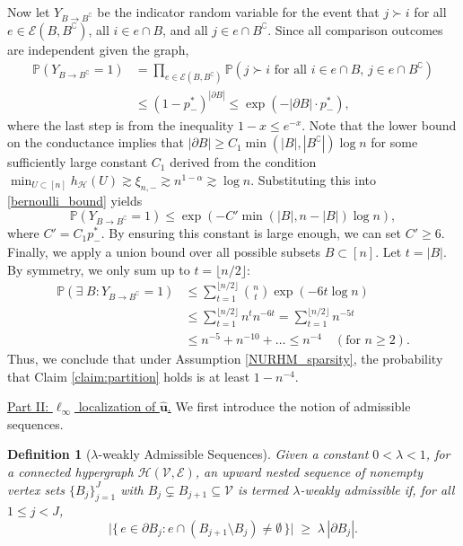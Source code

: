 \documentclass[
  12pt]{article}
\newtheorem{definition}{Definition}
\begin{document}
Now let $Y_{B \to B^\complement}$ be the indicator random variable for the event that  $j \succ i$ for all
$e \in \mathcal{E}(B, B^\complement)$, all $i \in e \cap B$, and all
$j \in e \cap B^\complement$. Since all comparison outcomes are independent given the graph,
\begin{align}
        \mathbb{P}\left(Y_{B \to B^\complement} = 1\right)& = \prod_{e \in \mathcal{E}(B, B^\complement)} \mathbb{P}\left(j \succ i \text{ for all }
            i \in e \cap B,\, j \in e \cap B^\complement\right) \nonumber\\
        &  \leq (1 - p^*_{-})^{|\partial B|} \leq \exp\left( - |\partial B| \cdot p^*_{-} \right),\label{bernoulli_bound}
\end{align}
where the last step is from the inequality $1-x \leq e^{-x}$. Note that the lower bound on the conductance implies that $|\partial B| \geq C_1 \min(|B|, |B^\complement|) \log n$ for some sufficiently large constant $C_1$ derived from the condition $\min_{U \subset[n]} h_{\mathcal{H}}(U) \gtrsim \xi_{n,-} \gtrsim n^{1-\alpha}\gtrsim \log n$. Substituting this into \eqref{bernoulli_bound} yields
$$
\mathbb{P}\left(Y_{B \to B^\complement} = 1\right) \leq \exp\left( - C' \min(|B|, n-|B|) \log n \right),
$$
where $C' = C_1 p^*_{-}$. By ensuring this constant is large enough, we can set $C' \geq 6$. Finally, we apply a union bound over all possible subsets $B \subset [n]$. Let $t = |B|$. By symmetry, we only sum up to $t = \lfloor n/2 \rfloor$:
$$
\begin{aligned}
\mathbb{P}(\exists \; B : Y_{B \to B^\complement} = 1) & \leq \sum_{t=1}^{\lfloor n/2 \rfloor} \binom{n}{t} \exp(- 6 t \log n) \\
& \leq \sum_{t=1}^{\lfloor n/2 \rfloor} n^t n^{-6t} = \sum_{t=1}^{\lfloor n/2 \rfloor} n^{-5t} \\
& \leq n^{-5} + n^{-10} + \dots \leq n^{-4} \quad (\text{for } n \geq 2).
\end{aligned}
$$
Thus, we conclude that under Assumption \ref{NURHM_sparsity}, the probability that Claim \ref{claim:partition} holds is at least $1 - n^{-4}$.


\underline{Part II: $\ell_\infty$ localization of $\widehat{\boldsymbol{u}}$.}  We first introduce the notion of admissible sequences.

\begin{definition}[$\lambda$-weakly Admissible Sequences]\label{lambda_weak}
Given a constant $0 < \lambda < 1$, for a connected hypergraph $\mathcal{H}(\mathcal{V}, \mathcal{E})$, an upward nested sequence of nonempty vertex sets $\{B_j\}_{j=1}^J$ with $B_j \subsetneq B_{j+1} \subseteq \mathcal{V}$ is termed $\lambda$-weakly admissible if, for all $1 \le j < J$,
\begin{equation}
\big|\{\, e \in \partial B_j : e \cap (B_{j+1} \setminus B_j) \neq \emptyset \,\}\big| \;\ge\; \lambda\, |\partial B_j|.
\end{equation}
\end{definition}
\end{document}
